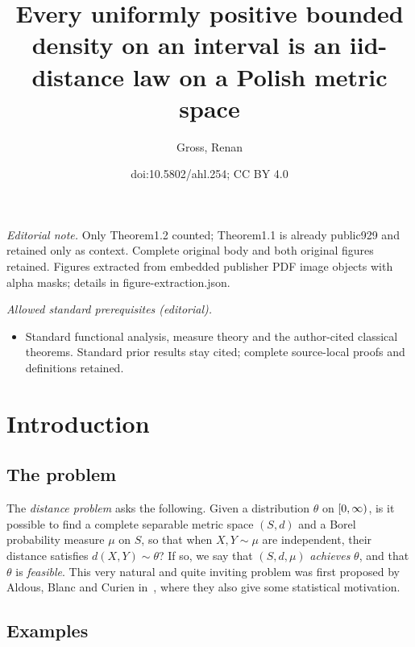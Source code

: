 \documentclass[10pt]{amsart}
\title{Every uniformly positive bounded density on an interval is an iid-distance law on a Polish metric space}
\author{Gross, Renan}
\date{doi:10.5802/ahl.254; CC BY 4.0}
\theoremstyle{definition}\newtheorem{defi}[theo]{Definition}\newtheorem{rema}[theo]{Remark}\newtheorem{exam}[theo]{Example}\newtheorem{exem}[theo]{Example}\newtheorem{nota}[theo]{Notation}
\newcommand*\nonnegative{\left[0,\infty\right)}
\let\originalleft\left
\let\originalright\right
\renewcommand{\left}{\mathopen{}\mathclose\bgroup\originalleft}
\renewcommand{\right}{\aftergroup\egroup\originalright}
\begin{document}
\maketitle
\noindent\textit{Editorial note.} Only Theorem1.2 counted; Theorem1.1 is already public929 and retained only as context. Complete original body and both original figures retained. Figures extracted from embedded publisher PDF image objects with alpha masks; details in figure-extraction.json.\par\medskip
\noindent\textit{Allowed standard prerequisites (editorial).}\begin{itemize}
\item Standard functional analysis, measure theory and the author-cited classical theorems. Standard prior results stay cited; complete source-local proofs and definitions retained.
\end{itemize}\medskip

\section{Introduction}
\subsection{The problem}

The \emph{distance problem} asks the following. Given a distribution $\theta$ on $\nonnegative$, is it possible to find a complete separable metric space $(S,d)$ and a Borel probability measure $\mu$ on $S$, so that when $X,Y\sim\mu$ are independent, their distance satisfies $d(X,Y)\sim\theta$? If so, we say that $(S,d,\mu)$
\emph{achieves} $\theta$, and that $\theta$ is \emph{feasible}. This very natural and quite inviting problem was first proposed by Aldous, Blanc and Curien in~\cite{aldous_blanc_curien_distance_problem_2024}, where they also give some statistical motivation.

\subsection{Examples}
\end{document}

